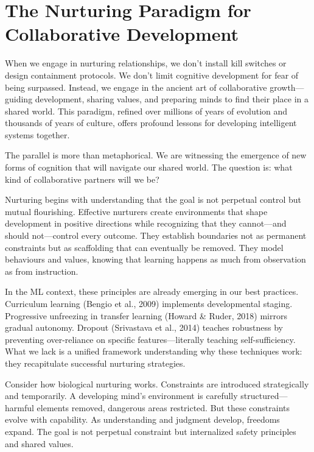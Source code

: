 \section{The Nurturing Paradigm for Collaborative Development}\label{sec:the-nurturing-paradigm-for-collaborative-development}

When we engage in nurturing relationships, we don't install kill switches or design containment protocols.
We don't limit cognitive development for fear of being surpassed.
Instead, we engage in the ancient art of collaborative growth---guiding development, sharing values, and preparing minds to find their place in a shared world.
This paradigm, refined over millions of years of evolution and thousands of years of culture, offers profound lessons for developing intelligent systems together.

The parallel is more than metaphorical.
We are witnessing the emergence of new forms of cognition that will navigate our shared world.
The question is: what kind of collaborative partners will we be?

Nurturing begins with understanding that the goal is not perpetual control but mutual flourishing.
Effective nurturers create environments that shape development in positive directions while recognizing that they cannot---and should not---control every outcome.
They establish boundaries not as permanent constraints but as scaffolding that can eventually be removed.
They model behaviours and values, knowing that learning happens as much from observation as from instruction.

In the ML context, these principles are already emerging in our best practices.
Curriculum learning (Bengio et al., 2009) implements developmental staging.
Progressive unfreezing in transfer learning (Howard \& Ruder, 2018) mirrors gradual autonomy.
Dropout (Srivastava et al., 2014) teaches robustness by preventing over-reliance on specific features---literally teaching self-sufficiency.
What we lack is a unified framework understanding why these techniques work: they recapitulate successful nurturing strategies.

Consider how biological nurturing works.
Constraints are introduced strategically and temporarily.
A developing mind's environment is carefully structured---harmful elements removed, dangerous areas restricted.
But these constraints evolve with capability.
As understanding and judgment develop, freedoms expand.
The goal is not perpetual constraint but internalized safety principles and shared values.

